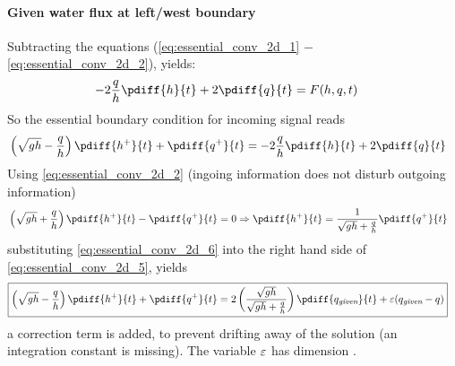 \paragraph*{Given water flux at left/west boundary}
Subtracting the equations (\eqref{eq:essential_conv_2d_1} $-$ \eqref{eq:essential_conv_2d_2}), yields:
\begin{align}
    - 2 \frac{q}{h}\pdiff{h}{t}  + 2 \pdiff{q}{t} & =  F(h, q, t)
\end{align}
So the essential boundary condition for incoming signal reads
\begin{align}
    & \left(\sqrt{gh} - \frac{q}{h}\right) \pdiff{h^{+}}{t} + \pdiff{q^{+}}{t} =
    - 2 \frac{q}{h}\pdiff{h}{t}  + 2 \pdiff{q}{t} \label{eq:essential_conv_2d_5}
\end{align}
Using \autoref{eq:essential_conv_2d_2} (ingoing information does not disturb outgoing information)
\begin{align}
    &\left(\sqrt{gh} + \frac{q}{h}\right) \pdiff{h^{+}}{t} - \pdiff{q^{+}}{t} = 0
    \Rightarrow
    \pdiff{h^{+}}{t}   =
    \frac{1}{\sqrt{gh} + \frac{q}{h}}\pdiff{q^{+}}{t}\label{eq:essential_conv_2d_6}
\end{align}
substituting \autoref{eq:essential_conv_2d_6} into the right hand side of \autoref{eq:essential_conv_2d_5}, yields
\begin{align}
    &{\boxed{
            \left(\sqrt{gh} - \frac{q}{h}\right) \pdiff{h^{+}}{t} + \pdiff{q^{+}}{t} =
            2 \left( \frac{\sqrt{gh}}{\sqrt{gh} + \frac{q}{h}} \right)\pdiff{q_{\textit{given}}}{t} + \eps(q_{\textit{given}} - q)
    }}\label{eq:essential_bc_2d_q}
\end{align}
a correction term is added, to prevent drifting away of the solution (an integration constant is missing).
The variable $\varepsilon$ has dimension \bunit{\per\second}.

